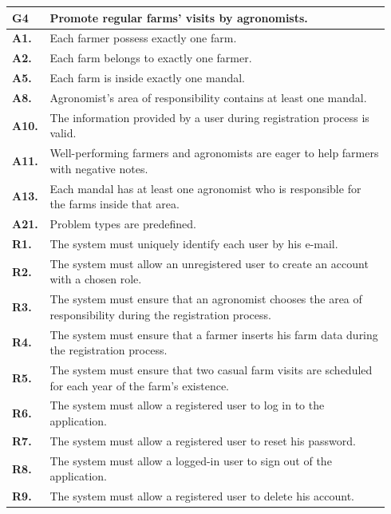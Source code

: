 \begin{longtable}{p{0.06\linewidth} p{0.88\linewidth}} 
    \toprule
    \textbf{G4} & Promote regular farms’ visits by agronomists. \\ 
    \midrule
    \textbf{A1.} & Each farmer possess exactly one farm.\\
    \textbf{A2.} & Each farm belongs to exactly one farmer.\\ 
    \textbf{A5.} & Each farm is inside exactly one mandal.\\ 
    \textbf{A8.} & Agronomist's area of responsibility contains at least one mandal.\\ 
    \textbf{A10.} & The information provided by a user during registration process is valid.\\ 
    \textbf{A11.} & Well-performing farmers and agronomists are eager to help farmers with negative notes.\\ 
    \textbf{A13.} & Each mandal has at least one agronomist who is responsible for the farms inside that area.\\ 
    \textbf{A21.} & Problem types are predefined.\\
    \midrule
    
	\textbf{R1.} & The system must uniquely identify each user by his e-mail. \\
	\textbf{R2.} & The system must allow an unregistered user to create an account with a chosen role. \\
	\textbf{R3.} & The system must ensure that an agronomist chooses the area of responsibility during the registration process. \\
	\textbf{R4.} & The system must ensure that a farmer inserts his farm data during the registration process.\\
	\textbf{R5.} & The system must ensure that two casual farm visits are scheduled for each year of the farm's existence.\\
	\textbf{R6.} & The system must allow a registered user to log in to the application. \\
	\textbf{R7.} & The system must allow a registered user to reset his password. \\
	\textbf{R8.} & The system must allow a logged-in user to sign out of the application. \\
	\textbf{R9.} & The system must allow a registered user to delete his account. \\
	

\end{longtable}
